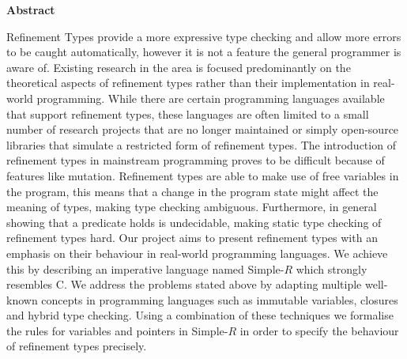 \newpage
{\Huge \bf Abstract}
\vspace{24pt} 

Refinement Types provide a more expressive type checking and allow more errors to be caught automatically, however it is not a feature the general programmer is aware of. Existing research in the area is focused predominantly on the theoretical aspects of refinement types rather than their implementation in real-world programming. While there are certain programming languages available that support refinement types, these languages are often limited to a small number of research projects that are no longer maintained or simply open-source libraries that simulate a restricted form of refinement types. The introduction of refinement types in mainstream programming proves to be difficult because of features like mutation. Refinement types are able to make use of free variables in the program, this means that a change in the program state might affect the meaning of types, making type checking ambiguous. Furthermore, in general showing that a predicate holds is undecidable, making static type checking of refinement types hard. Our project aims to present refinement types with an emphasis on their behaviour in real-world programming languages. We achieve this by describing an imperative language named Simple-$R$ which strongly resembles C. We address the problems stated above by adapting multiple well-known concepts in programming languages such as immutable variables, closures and hybrid type checking. Using a combination of these techniques we formalise the rules for variables and pointers in Simple-$R$ in order to specify the behaviour of refinement types precisely. 

\newpage
\vspace*{\fill}
